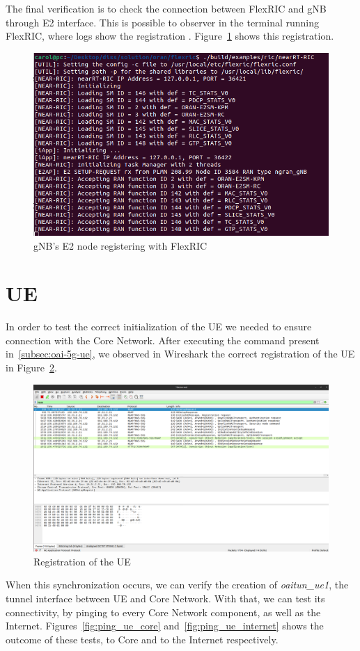 The final verification is to check the connection between FlexRIC and gNB through E2 interface.
This is possible to observer in the terminal running FlexRIC, where logs show the registration .
Figure~\ref{fig:gnb_e2} shows this registration.

\begin{figure}[H]
    \centering
    \includegraphics[width=0.5\linewidth]{figures/gnb_e2_flexric}
    \caption[gNB's E2 node registering with FlexRIC]{gNB's E2 node registering with FlexRIC}
    \label{fig:gnb_e2}
\end{figure}

\section{UE}\label{sec:ue}

In order to test the correct initialization of the UE we needed to ensure connection with the Core Network.
After executing the command present in~\ref{subsec:oai-5g-ue}, we observed in Wireshark the correct registration of the UE in Figure~\ref{fig:registration_ue}.

\begin{figure}[H]
    \centering
    \includegraphics[width=0.5\linewidth]{figures/ue_registration}
    \caption{Registration of the UE}
    \label{fig:registration_ue}
\end{figure}

When this synchronization occurs, we can verify the creation of \textit{oaitun\_ue1}, the tunnel interface between UE and Core Network.
With that, we can test its connectivity, by pinging to every Core Network component, as well as the Internet.
Figures~\ref{fig:ping_ue_core} and~\ref{fig:ping_ue_internet} shows the outcome of these tests, to Core and to the Internet respectively.

